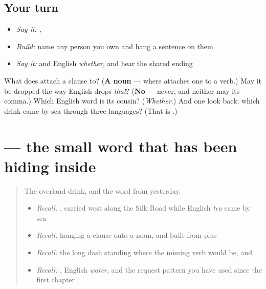 \subsection*{Your turn}
\begin{itemize}
\raggedright
  \item \emph{Say it:} \emph{,  }
  \item \emph{Build:} name any person you own and hang a sentence on them
  \item \emph{Say it:} \emph{} and English \emph{whether}, and hear the shared ending
\end{itemize}

\begin{tcolorbox}[breakable,colback=teal!4,colframe=teal!35!black,title={Before you move on}]
What does \textbf{} attach a clause to? (\textbf{A noun} — where \textbf{} attaches one to a verb.) May it be dropped the way English drops \emph{that}? (\textbf{No} — never, and neither may its comma.) Which English word is its cousin? (\emph{Whether}.) And one look back: which drink came by sea through three languages? (That is \textbf{}.)
\end{tcolorbox}
\section[\texorpdfstring{\ru{ли} (li)}{ли (li)}]{ — the small word that has been hiding inside }

\label{lesson:RU-C22-li}



\begin{quote}
The overland drink, and the word from yesterday.

\begin{itemize}
\raggedright
  \item \emph{Recall:} \emph{}, carried west along the Silk Road while English \emph{tea} came by sea
  \item \emph{Recall:} \emph{} hanging a clause onto a noun, and \emph{} built from \textbf{} plus \textbf{}
  \item \emph{Recall:} the long dash standing where the missing verb would be, and \emph{}
  \item \emph{Recall:} \emph{}, English \emph{water}, and the request pattern you have used since the first chapter
\end{itemize}
\end{quote}

